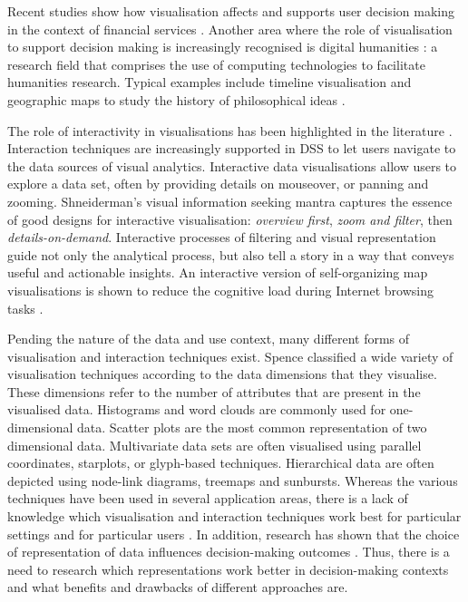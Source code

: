 \documentclass[final,5p,times,twocolumn,authoryear]{elsarticle}
\begin{document}
Recent studies show how visualisation affects and supports user decision making in the context of financial services \citep{ben2012assessing}. 
Another area where the role of visualisation to support decision making is increasingly recognised is digital humanities \citep{jessop2008digital}: a research field that comprises the use of computing technologies to facilitate humanities research. Typical examples include timeline visualisation and geographic maps to study the history of philosophical ideas \citep{timemapper}. 


The role of interactivity in visualisations has been highlighted in the literature \citep{park2016bicentric}. 
Interaction techniques are increasingly supported in DSS to let users navigate to the data sources of visual analytics. Interactive data visualisations allow users to explore a data set, often by providing details on mouseover, or panning and zooming. Shneiderman's visual information seeking mantra \citep{shneiderman1996} captures the essence of good designs for interactive visualisation: \emph{overview first}, \emph{zoom and filter}, then \emph{details-on-demand}. 
Interactive processes of filtering and visual representation guide not only the analytical process, but also tell a story in a way that conveys useful and actionable insights. An interactive version of self-organizing map visualisations is shown to reduce the cognitive load during Internet browsing tasks \citep{yang2003visualization}.

Pending the nature of the data and use context, many different forms of visualisation and interaction techniques exist. Spence \citep{spence2001information} classified a wide variety of visualisation techniques according to the data dimensions that they visualise. These dimensions refer to the number of attributes that are present in the visualised data. 
Histograms and word clouds are commonly used for one-dimensional data. Scatter plots are the most common representation of two dimensional data. Multivariate data sets are often visualised using parallel coordinates, starplots, or glyph-based techniques. Hierarchical data are often depicted using node-link diagrams, treemaps and sunbursts. 
Whereas the various techniques have been used in several application areas, there is a lack of knowledge which visualisation and interaction techniques work best for particular settings and for particular users \citep{he2016interactive}. In addition, research has shown that the 
 choice of representation of data influences decision-making outcomes \citep{speier2006influence, gettinger2012shall}. Thus, there is a need to research which representations work better in decision-making contexts and what benefits and drawbacks of different approaches are.
\end{document}
